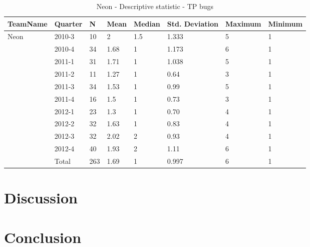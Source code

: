 \documentclass[UKenglish]{ifimaster}  %
\begin{document}
\begin{table}[!htbp]
\begin{tabular}{ | l | l | l | l | l | l | l | l | }
\hline
	TeamName & Quarter & N & Mean & Median & Std. Deviation & Maximum & Minimum \\ \hline
	Neon & 2010-3 & 10 & 2 & 1.5 & 1.333 & 5 & 1 \\ \hline
	 & 2010-4 & 34 & 1.68 & 1 & 1.173 & 6 & 1 \\ \hline
	 & 2011-1 & 31 & 1.71 & 1 & 1.038 & 5 & 1 \\ \hline
	 & 2011-2 & 11 & 1.27 & 1 & 0.64 & 3 & 1 \\ \hline
	 & 2011-3 & 34 & 1.53 & 1 & 0.99 & 5 & 1 \\ \hline
	 & 2011-4 & 16 & 1.5 & 1 & 0.73 & 3 & 1 \\ \hline
	 & 2012-1 & 23 & 1.3 & 1 & 0.70 & 4 & 1 \\ \hline
	 & 2012-2 & 32 & 1.63 & 1 & 0.83 & 4 & 1 \\ \hline
	 & 2012-3 & 32 & 2.02& 2 & 0.93& 4 & 1 \\ \hline
	 & 2012-4 & 40 & 1.93 & 2 & 1.11 & 6 & 1 \\ \hline
	 & Total & 263 & 1.69 & 1 & 0.997 & 6 & 1 \\ \hline
\end{tabular}
\caption{Neon - Descriptive statistic - TP bugs}
\end{table}

\chapter{Discussion}
\label{ch:dis}

\chapter{Conclusion}
\label{ch:con}


\backmatter{}
\printbibliography
\end{document}
